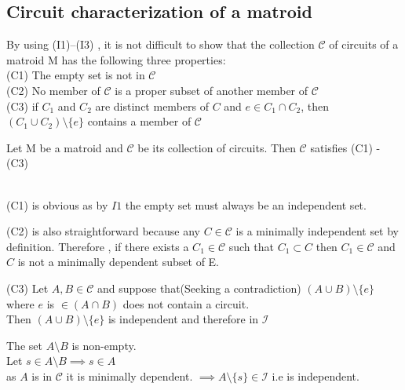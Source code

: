 \documentclass[../main.tex]{subfiles}
\begin{document}
\subsection{Circuit characterization of a matroid}

\begin{defn} By using (I1)–(I3) , it is not difficult to show that the collection $\mathcal{C}$ of circuits of a matroid M has the following three properties:\\
(C1) The empty set is not in $\mathcal{C}$\\
(C2) No member of $\mathcal{C}$ is a proper subset of another member of $\mathcal{C}$\\
(C3) if $ C_1 $ and $ C_2 $ are distinct members of $ C $ and 
$ e \in C_1 \cap C_2 $, then $ (C_1 \cup C_2 ) \setminus \{e\} $ contains a member of $\mathcal{C}$ 
 \end{defn}
 
 \vspace{5mm}
 
 \begin{thm}
 Let M be a matroid and $\mathcal{C}$ be its collection of circuits. Then $\mathcal{C}$ satisfies (C1) - (C3)
  \end{thm}
 
 \noindent\textbf\Proof \\
 \noindent (C1) is obvious as by $I1$ the empty set must always be an independent set.
 
 \vspace{2mm}
 
 \noindent (C2) is also straightforward because any $ C \in \mathcal{C} $ is a minimally independent set by definition. Therefore , if there exists a $ C_1 \in \mathcal{C} $ such that $ C_1 \subset C $ then $ C_1 \in \mathcal{C} $ and $ C $ is not a minimally dependent subset of E. 
 
 \vspace{2mm}
 
 \noindent (C3) Let $ A, B \in \mathcal{C} $ and suppose that(Seeking a contradiction) $ (A \cup B) \setminus \{e\} $ where $ e $ is $ \in (A \cap B) $ does not contain a circuit.\\
 \noindent Then $ (A \cup B) \setminus \{e\} $ is independent and therefore in $\mathcal{I}$
 
 \vspace{2mm}
 
\noindent The set $ A \setminus B $ is non-empty.\\
 Let $ s \in A \setminus B    \implies s \in A$\\
 \noindent as $A$ is in $\mathcal{C}$ it is minimally dependent.
 \noindent $\implies A \setminus \{s\} \in \mathcal{I}$ i.e is independent.
 
\end{document}
